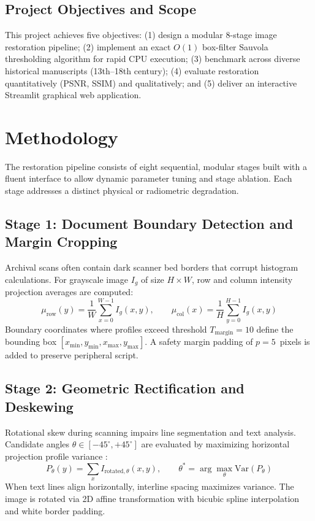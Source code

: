 \documentclass[11pt, a4paper]{article}
\begin{document}
\subsection{Project Objectives and Scope}
This project achieves five objectives: (1) design a modular 8-stage image restoration pipeline; (2) implement an exact $O(1)$ box-filter Sauvola thresholding algorithm for rapid CPU execution; (3) benchmark across diverse historical manuscripts (13th--18th century); (4) evaluate restoration quantitatively (PSNR, SSIM) and qualitatively; and (5) deliver an interactive Streamlit graphical web application.

\section{Methodology}

The restoration pipeline consists of eight sequential, modular stages built with a fluent interface to allow dynamic parameter tuning and stage ablation. Each stage addresses a distinct physical or radiometric degradation.

\subsection{Stage 1: Document Boundary Detection and Margin Cropping}
Archival scans often contain dark scanner bed borders that corrupt histogram calculations. For grayscale image $I_g$ of size $H \times W$, row and column intensity projection averages are computed:
\begin{equation}
\mu_{\text{row}}(y) = \frac{1}{W} \sum_{x=0}^{W-1} I_g(x, y), \qquad \mu_{\text{col}}(x) = \frac{1}{H} \sum_{y=0}^{H-1} I_g(x, y)
\end{equation}
Boundary coordinates where profiles exceed threshold $T_{\text{margin}} = 10$ define the bounding box $[x_{\min}, y_{\min}, x_{\max}, y_{\max}]$. A safety margin padding of $p = 5$~pixels is added to preserve peripheral script.

\subsection{Stage 2: Geometric Rectification and Deskewing}
Rotational skew during scanning impairs line segmentation and text analysis. Candidate angles $\theta \in [-45^\circ, +45^\circ]$ are evaluated by maximizing horizontal projection profile variance \cite{niblack1986}:
\begin{equation}
P_\theta(y) = \sum_x I_{\text{rotated}, \theta}(x, y), \qquad \theta^* = \arg\max_\theta \text{Var}(P_\theta)
\end{equation}
When text lines align horizontally, interline spacing maximizes variance. The image is rotated via 2D affine transformation with bicubic spline interpolation and white border padding.
\end{document}
